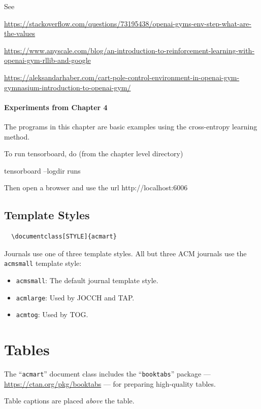 \documentclass[acmlarge,screen]{acmart}
\begin{document}
See

\noindent \url{https://stackoverflow.com/questions/73195438/openai-gyms-env-step-what-are-the-values}

\noindent \url{https://www.anyscale.com/blog/an-introduction-to-reinforcement-learning-with-openai-gym-rllib-and-google}

\noindent \url{https://aleksandarhaber.com/cart-pole-control-environment-in-openai-gym-gymnasium-introduction-to-openai-gym/}


\paragraph{Experiments from Chapter 4} The programs in this chapter are basic examples using the cross-entropy learning method.

To run tensorboard, do (from the chapter level directory)

tensorboard --logdir runs

Then open a browser and use the url http://localhost:6006




\subsection{Template Styles}


\begin{verbatim}
  \documentclass[STYLE]{acmart}
\end{verbatim}

Journals use one of three template styles. All but three ACM journals use the {\verb|acmsmall|} template style:
\begin{itemize}
\item {\verb|acmsmall|}: The default journal template style.
\item {\verb|acmlarge|}: Used by JOCCH and TAP.
\item {\verb|acmtog|}: Used by TOG.
\end{itemize}


\section{Tables}

The ``\verb|acmart|'' document class includes the ``\verb|booktabs|'' package --- \url{https://ctan.org/pkg/booktabs} --- for preparing high-quality tables. 

Table captions are placed {\it above} the table.
\end{document}

